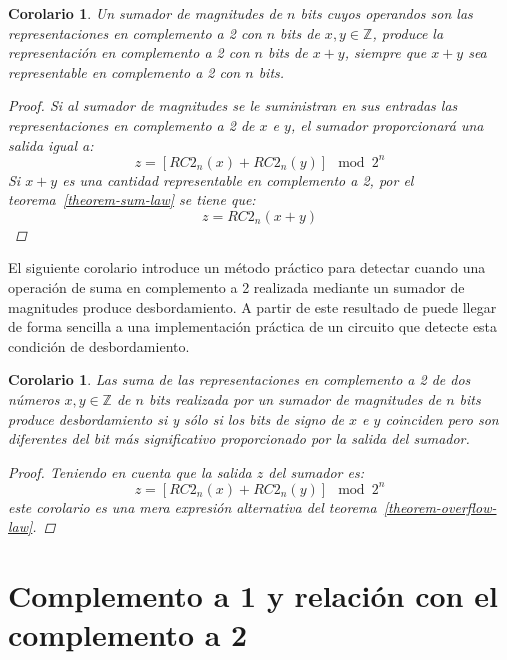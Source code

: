 \documentclass[spanish,a4paper,12pt,titlepage]{article}
\newtheorem{corollary}[theorem]{Corolario}
\theoremstyle{definition}
\theoremstyle{remark}
\newcommand{\bbZ}{\mathbb{Z}}
\begin{document}
\begin{corollary}
    Un sumador de magnitudes de $n$ bits cuyos operandos son las representaciones en complemento a 2 con $n$ bits de $x, y \in \bbZ$, produce la representación en complemento a 2 con $n$ bits de $x+y$, siempre que $x+y$ sea representable en complemento a 2 con $n$ bits.
    \begin{proof}
        Si al sumador de magnitudes se le suministran en sus entradas las representaciones en complemento a 2 de $x$ e $y$, el sumador proporcionará una salida igual a:
        \[
            z = [RC2_n(x)+RC2_n(y)] \mod 2^n
        \]
        Si $x+y$ es una cantidad representable en complemento a 2, por el teorema~\ref{theorem-sum-law} se tiene que:
        \[
            z = RC2_n(x + y)
        \]
    \end{proof}
\end{corollary}

El siguiente corolario introduce un método práctico para detectar cuando una operación de suma en complemento a 2 realizada mediante un sumador de magnitudes produce desbordamiento. A partir de este resultado de puede llegar de forma sencilla a una implementación práctica de un circuito que detecte esta condición de desbordamiento.

\begin{corollary}
    Las suma de las representaciones en complemento a 2 de dos números $x, y \in \bbZ$ de $n$ bits realizada por un sumador de magnitudes de $n$ bits produce desbordamiento si y sólo si los bits de signo de $x$ e $y$ coinciden pero son diferentes del bit más significativo proporcionado por la salida del sumador.
    \begin{proof}
        Teniendo en cuenta que la salida $z$ del sumador es:
        \[
            z = [RC2_n(x)+RC2_n(y)] \mod 2^n
        \]
        este corolario es una mera expresión alternativa del teorema~\ref{theorem-overflow-law}.
    \end{proof}
\end{corollary}


\section{Complemento a 1 y relación con el complemento a 2}
\end{document}
